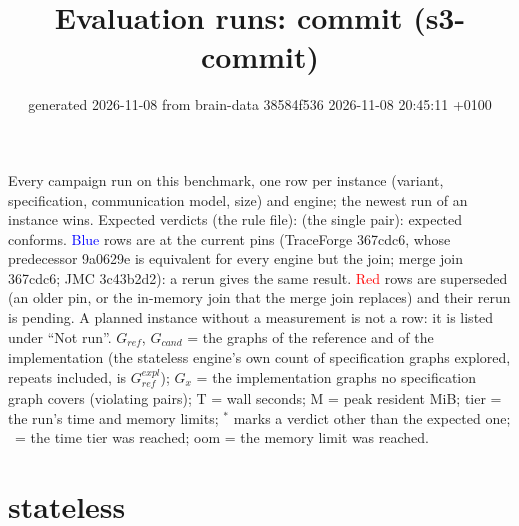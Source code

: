 \documentclass[10pt]{article}
\title{Evaluation runs: \textsf{commit} (s3-commit)}
\author{}
\date{generated 2026-11-08 from brain-data 38584f536 2026-11-08 20:45:11 +0100}
\begin{document}
\maketitle\small
\noindent Every campaign run on this benchmark, one row per instance (variant, specification, communication model, size) and engine; the newest run of an instance wins. Expected verdicts (the rule file): (the single pair): expected conforms. \textcolor{blue}{Blue} rows are at the current pins (TraceForge 367cdc6, whose predecessor 9a0629e is equivalent for every engine but the join; merge join 367cdc6; JMC 3c43b2d2): a rerun gives the same result. \textcolor{red}{Red} rows are superseded (an older pin, or the in-memory join that the merge join replaces) and their rerun is pending. A planned instance without a measurement is not a row: it is listed under ``Not run''. $G_{\mathit{ref}}$, $G_{\mathit{cand}}$ = the graphs of the reference and of the implementation (the stateless engine's own count of specification graphs explored, repeats included, is $G_{\mathit{ref}}^{\mathit{expl}}$); $G_x$ = the implementation graphs no specification graph covers (violating pairs); T = wall seconds; M = peak resident MiB; tier = the run's time and memory limits; $^{\ast}$ marks a verdict other than the expected one; \faClock\ = the time tier was reached; oom = the memory limit was reached.

\section*{stateless}
\end{document}
